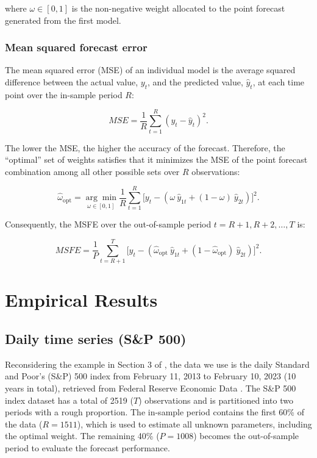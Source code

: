 \documentclass{monashthesis}
\begin{document}
where \(\omega\in [0,1]\) is the non-negative weight allocated to the point forecast generated from the first model.

\hypertarget{mean-squared-forecast-error}{%
\subsection{Mean squared forecast error}\label{mean-squared-forecast-error}}

The mean squared error (MSE) of an individual model is the average squared difference between the actual value, \(y_t\), and the predicted value, \(\hat y_t\), at each time point over the in-sample period \(R\):

\begin{equation}
\label{eqn:MSE1}
MSE = \frac{1}{R} \sum^R_{t=1} (y_t - \hat y_t)^2.
\end{equation}

The lower the MSE, the higher the accuracy of the forecast. Therefore, the ``optimal'' set of weights satisfies that it minimizes the MSE of the point forecast combination among all other possible sets over \(R\) observations:

\begin{equation}
\label{eqn:MSE2}
\hat{\omega}_{\text{opt}} = \underset{\omega \in [0,1]}{\arg\min} \frac{1}{R} \sum^R_{t=1} \Big[y_t - (\omega \ \hat y_{1t} + (1-\omega) \ \hat y_{2t})\Big]^2.
\end{equation}

Consequently, the MSFE over the out-of-sample period \(t = R+1, R+2, \dots, T\) is:

\begin{equation}
\label{eqn:MSFE3}
MSFE = \frac{1}{P} \sum^T_{t = R+1} \Big[y_t - (\hat{\omega}_{\text{opt}} \ \hat y_{1t} + (1-\hat{\omega}_{\text{opt}}) \ \hat y_{2t}) \Big]^2.
\end{equation}

\hypertarget{empirical-results}{%
\chapter{Empirical Results}\label{empirical-results}}

\hypertarget{sp500}{%
\section{Daily time series (S\&P 500)}\label{sp500}}

Reconsidering the example in Section 3 of \textcite{GA11}, the data we use is the daily Standard and Poor's (S\&P) 500 index from February 11, 2013 to February 10, 2023 (10 years in total), retrieved from Federal Reserve Economic Data \autocite{SP500}. The S\&P 500 index dataset has a total of 2519 (\(T\)) observations and is partitioned into two periods with a rough proportion. The in-sample period contains the first 60\% of the data (\(R = 1511\)), which is used to estimate all unknown parameters, including the optimal weight. The remaining 40\% (\(P = 1008\)) becomes the out-of-sample period to evaluate the forecast performance.
\end{document}
